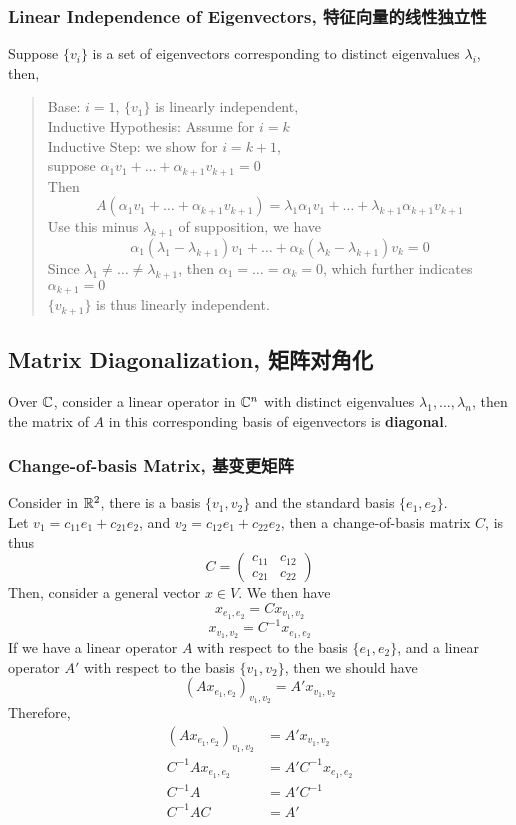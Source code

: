 \subsubsection{Linear Independence of Eigenvectors, 特征向量的线性独立性}
Suppose $\{v_i\}$ is a set of eigenvectors corresponding to distinct eigenvalues $\lambda_i$, then,
\begin{quote}
    Base: $i = 1$, $\{v_1\}$ is linearly independent, \\
    Inductive Hypothesis: Assume for $i = k$ \\
    Inductive Step: we show for $i = k + 1$, \\
    suppose $\alpha_1 v_1 + \dots + \alpha_{k+1} v_{k+1} = 0$ \\
    Then 
    $$A(\alpha_1 v_1 + \dots + \alpha_{k+1} v_{k+1}) = \lambda_1 \alpha_1 v_1 + \dots + \lambda_{k+1} \alpha_{k+1} v_{k+1}$$
    Use this minus $\lambda_{k+1}$ of supposition, we have
    $$\alpha_1(\lambda_1 - \lambda_{k+1})v_1 + \dots + \alpha_k(\lambda_k - \lambda_{k+1})v_k = 0$$
    Since $\lambda_1 \ne \dots \ne \lambda_{k+1}$, then $\alpha_1 = \dots = \alpha_k = 0$, which further indicates $\alpha_{k+1} = 0$ \\
    $\{v_{k+1}\}$ is thus linearly independent.
\end{quote}

\subsection{Matrix Diagonalization, 矩阵对角化}
Over $\mathbb{C}$, consider a linear operator in $\mathbb{C}^n$ with distinct eigenvalues $\lambda_1, \dots, \lambda_n$, then the matrix of $A$ in this corresponding basis of eigenvectors is \textbf{diagonal}. \\
\subsubsection{Change-of-basis Matrix, 基变更矩阵}
Consider in $\mathbb{R}^2$, there is a basis $\{v_1, v_2\}$ and the standard basis $\{e_1, e_2\}$. \\
Let $v_1 = c_{11} e_1 + c_{21} e_2$, and $v_2 = c_{12} e_1 + c_{22} e_2$, then a change-of-basis matrix $C$, is thus
$$C = \begin{pmatrix}
    c_{11} & c_{12} \\
    c_{21} & c_{22}
\end{pmatrix}$$
Then, consider a general vector $x \in V$. We then have
$$x_{e_1, e_2} = C x_{v_1, v_2}$$
$$x_{v_1, v_2} = C^{-1} x_{e_1, e_2}$$
If we have a linear operator $A$ with respect to the basis $\{e_1, e_2\}$, and a linear operator $A'$ with respect to the basis $\{v_1, v_2\}$, then we should have
$$(A x_{e_1, e_2})_{v_1, v_2} = A'x_{v_1, v_2}$$
Therefore,
\begin{align*}
    (A x_{e_1, e_2})_{v_1, v_2} &= A'x_{v_1, v_2} \\
    C^{-1}A x_{e_1, e_2} &= A'C^{-1} x_{e_1, e_2} \\
    C^{-1}A &= A'C^{-1} \\
    C^{-1}AC &= A'
\end{align*}
